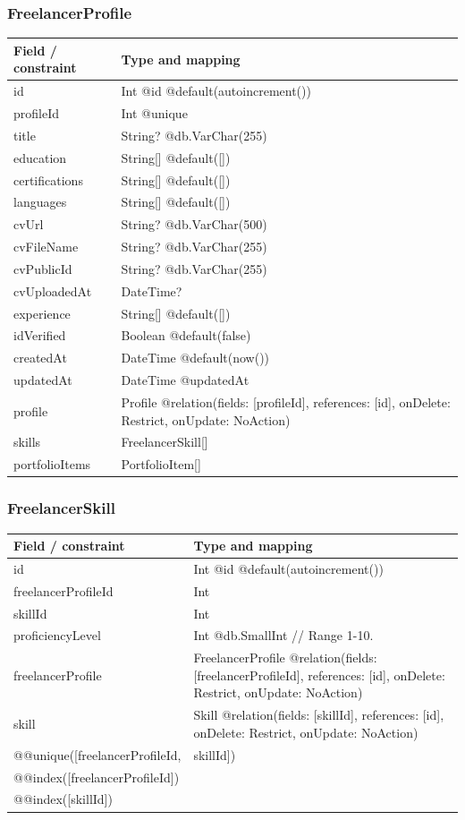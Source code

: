 \subsubsection{FreelancerProfile}
\begin{longtable}{|L{3.3cm}|L{10.8cm}|}\hline
Field / constraint & Type and mapping \\ \hline
id & Int @id @default(autoincrement()) \\ \hline
profileId & Int @unique \\ \hline
title & String? @db.VarChar(255) \\ \hline
education & String[] @default([]) \\ \hline
certifications & String[] @default([]) \\ \hline
languages & String[] @default([]) \\ \hline
cvUrl & String? @db.VarChar(500) \\ \hline
cvFileName & String? @db.VarChar(255) \\ \hline
cvPublicId & String? @db.VarChar(255) \\ \hline
cvUploadedAt & DateTime? \\ \hline
experience & String[] @default([]) \\ \hline
idVerified & Boolean @default(false) \\ \hline
createdAt & DateTime @default(now()) \\ \hline
updatedAt & DateTime @updatedAt \\ \hline
profile & Profile @relation(fields: [profileId], references: [id], onDelete: Restrict, onUpdate: NoAction) \\ \hline
skills & FreelancerSkill[] \\ \hline
portfolioItems & PortfolioItem[] \\ \hline
\end{longtable}
\subsubsection{FreelancerSkill}
\begin{longtable}{|L{3.3cm}|L{10.8cm}|}\hline
Field / constraint & Type and mapping \\ \hline
id & Int @id @default(autoincrement()) \\ \hline
freelancerProfileId & Int \\ \hline
skillId & Int \\ \hline
proficiencyLevel & Int @db.SmallInt // Range 1-10. \\ \hline
freelancerProfile & FreelancerProfile @relation(fields: [freelancerProfileId], references: [id], onDelete: Restrict, onUpdate: NoAction) \\ \hline
skill & Skill @relation(fields: [skillId], references: [id], onDelete: Restrict, onUpdate: NoAction) \\ \hline
@@unique([freelancerProfileId, & skillId]) \\ \hline
@@index([freelancerProfileId]) &  \\ \hline
@@index([skillId]) &  \\ \hline
\end{longtable}
